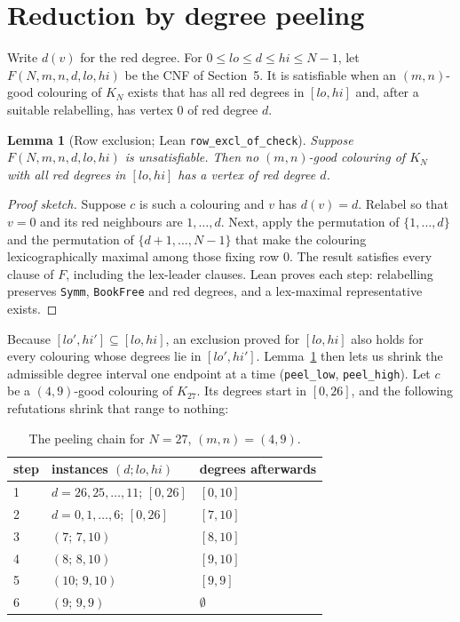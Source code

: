 \documentclass[11pt]{amsart}
\newtheorem{lemma}[theorem]{Lemma}
\theoremstyle{definition}
\begin{document}
\section{Reduction by degree peeling}

Write $d(v)$ for the red degree. For $0\le lo\le d\le hi\le N-1$, let
$F(N,m,n,d,lo,hi)$ be the CNF of Section~5. It is satisfiable when an
$(m,n)$-good colouring of $K_N$ exists that has all red degrees in
$[lo,hi]$ and, after a suitable relabelling, has vertex $0$ of red
degree $d$.

\begin{lemma}[Row exclusion; Lean \texttt{row\_excl\_of\_check}]
\label{lem:rowexcl}
Suppose $F(N,m,n,d,lo,hi)$ is unsatisfiable. Then no $(m,n)$-good
colouring of $K_N$ with all red degrees in $[lo,hi]$ has a vertex of
red degree $d$.
\end{lemma}

\begin{proof}[Proof sketch]
Suppose $c$ is such a colouring and $v$ has $d(v)=d$. Relabel so that
$v=0$ and its red neighbours are $1,\dots,d$. Next, apply the
permutation of $\{1,\dots,d\}$ and the permutation of
$\{d+1,\dots,N-1\}$ that make the colouring lexicographically maximal
among those fixing row $0$. The result satisfies every clause of $F$,
including the lex-leader clauses. Lean proves each step: relabelling
preserves \texttt{Symm}, \texttt{BookFree} and red degrees, and a
lex-maximal representative exists.
\end{proof}

Because $[lo',hi']\subseteq[lo,hi]$, an exclusion proved for $[lo,hi]$
also holds for every colouring whose degrees lie in $[lo',hi']$.
Lemma~\ref{lem:rowexcl} then lets us shrink the admissible degree
interval one endpoint at a time (\texttt{peel\_low},
\texttt{peel\_high}). Let $c$ be a $(4,9)$-good colouring of $K_{27}$.
Its degrees start in $[0,26]$, and the following refutations shrink
that range to nothing:

\begin{table}[h]
\centering
\caption{The peeling chain for $N=27$, $(m,n)=(4,9)$.}
\begin{tabular}{lll}
\toprule
step & instances $(d;lo,hi)$ & degrees afterwards \\
\midrule
1 & $d=26,25,\dots,11$; $[0,26]$ & $[0,10]$ \\
2 & $d=0,1,\dots,6$; $[0,26]$    & $[7,10]$ \\
3 & $(7;\,7,10)$                 & $[8,10]$ \\
4 & $(8;\,8,10)$                 & $[9,10]$ \\
5 & $(10;\,9,10)$                & $[9,9]$  \\
6 & $(9;\,9,9)$                  & $\emptyset$ \\
\bottomrule
\end{tabular}
\end{table}
\end{document}

